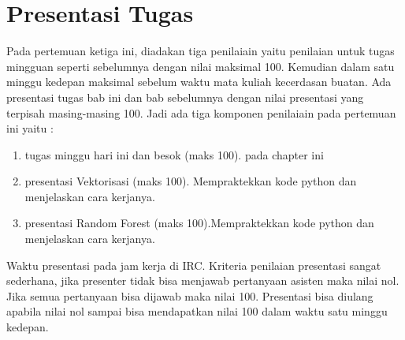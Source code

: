 \section{Presentasi Tugas}
Pada pertemuan ketiga ini, diadakan tiga penilaiain yaitu penilaian untuk tugas mingguan seperti sebelumnya dengan nilai maksimal 100. Kemudian dalam satu minggu kedepan maksimal sebelum waktu mata kuliah kecerdasan buatan. Ada presentasi tugas bab ini dan bab sebelumnya dengan nilai presentasi yang terpisah masing-masing 100. Jadi ada tiga komponen penilaiain pada pertemuan ini yaitu :
\begin{enumerate}
	\item tugas minggu hari ini dan besok (maks 100). pada chapter ini
	\item presentasi Vektorisasi (maks 100). Mempraktekkan kode python dan menjelaskan cara kerjanya.
	\item presentasi Random Forest (maks 100).Mempraktekkan kode python dan menjelaskan cara kerjanya.
\end{enumerate}
Waktu presentasi pada jam kerja di IRC. Kriteria penilaian presentasi sangat sederhana, jika presenter tidak bisa menjawab pertanyaan asisten maka nilai nol. Jika semua pertanyaan bisa dijawab maka nilai 100. Presentasi bisa diulang apabila nilai nol sampai bisa mendapatkan nilai 100 dalam waktu satu minggu kedepan.


